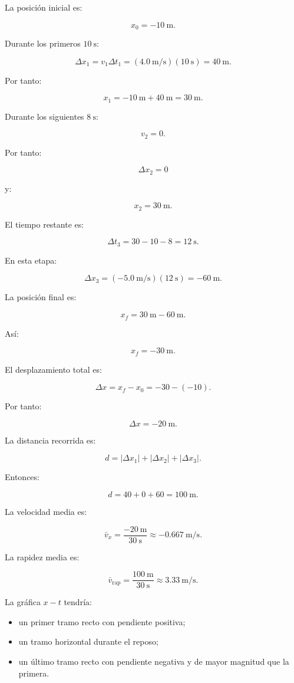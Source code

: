 \begin{explicacion}
La posición inicial es:

\[ x_0=-\SI{10}{\meter}. \]

Durante los primeros \(\SI{10}{\second}\):

\[
\Delta x_1
=
v_1\Delta t_1
=
(\SI{4.0}{\meter\per\second})
(\SI{10}{\second})
=
\SI{40}{\meter}.
\]

Por tanto:

\[
x_1
=
-\SI{10}{\meter}
+
\SI{40}{\meter}
=
\boxed{\SI{30}{\meter}}.
\]

Durante los siguientes \(\SI{8}{\second}\):

\[ v_2=0. \]

Por tanto:

\[
\Delta x_2=0
\]

y:

\[ \boxed{x_2=\SI{30}{\meter}}. \]

El tiempo restante es:

\[
\Delta t_3
=
30-10-8
=
\SI{12}{\second}.
\]

En esta etapa:

\[
\Delta x_3
=
(-\SI{5.0}{\meter\per\second})
(\SI{12}{\second})
=
-\SI{60}{\meter}.
\]

La posición final es:

\[
x_f
=
\SI{30}{\meter}
-
\SI{60}{\meter}.
\]

Así:

\[ \boxed{x_f=-\SI{30}{\meter}}. \]

El desplazamiento total es:

\[
\Delta x
=
x_f-x_0
=
-30-(-10).
\]

Por tanto:

\[ \boxed{\Delta x=-\SI{20}{\meter}}. \]

La distancia recorrida es:

\[
d
=
|\Delta x_1|
+
|\Delta x_2|
+
|\Delta x_3|.
\]

Entonces:

\[
d
=
40+0+60
=
\boxed{\SI{100}{\meter}}.
\]

La velocidad media es:

\[
\bar{v}_x
=
\frac{-\SI{20}{\meter}}
{\SI{30}{\second}}
\approx
\boxed{-\SI{0.667}{\meter\per\second}}.
\]

La rapidez media es:

\[
\bar{v}_{\mathrm{rap}}
=
\frac{\SI{100}{\meter}}
{\SI{30}{\second}}
\approx
\boxed{\SI{3.33}{\meter\per\second}}.
\]

La gráfica \(x-t\) tendría:

\begin{itemize}
    \item un primer tramo recto con pendiente positiva;
    \item un tramo horizontal durante el reposo;
    \item un último tramo recto con pendiente negativa y de mayor magnitud que la primera.
\end{itemize}
\end{explicacion}


